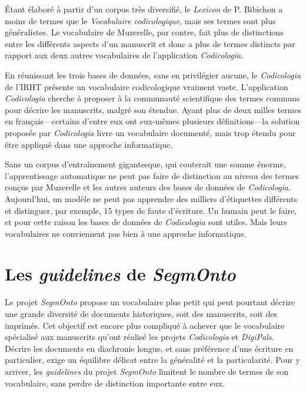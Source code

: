 \documentclass[class=article, crop=false]{standalone}
\begin{document}
\noindent Étant élaboré à partir d'un corpus très diversifié, le \textit{Lexicon} de P. Bibichon a moins de termes que le \textit{Vocabulaire codicologique}, mais ses termes sont plus généralistes. Le vocabulaire de Muzerelle, par contre, fait plus de distinctions entre les différents aspects d'un manuscrit et donc a plus de termes distincts par rapport aux deux autres vocabulaires de l'application \textit{Codicologia}.

En réunissant les trois bases de données, sans en privilégier aucune, le \textit{Codicologia} de l'IRHT présente un vocabulaire codicologique vraiment vaste. 
L'application \textit{Codicologia} cherche à proposer à la communauté scientifique des termes communs pour décrire les manuscrits, malgré son étendue.
Ayant plus de deux milles termes en français---certains d'entre eux ont eux-mêmes plusieurs définitions---la solution proposée par \textit{Codicologia} livre un vocabulaire documenté, mais trop étendu pour être appliqué dans une approche informatique.

Sans un corpus d'entraînement gigantesque, qui couterait une somme énorme, l'apprentissage automatique ne peut pas faire de distinction au niveau des termes conçus par Muzerelle et les autres auteurs des bases de données de \textit{Codicologia}. Aujourd'hui, un modèle ne peut pas apprendre des milliers d'étiquettes différents et distinguer, par exemple, 15 types de faute d'écriture. Un humain peut le faire, et pour cette raison les bases de données de \textit{Codicologia} sont utiles. Mais leurs vocabulaires ne conviennent pas bien à une approche informatique.  

\section{Les \textit{guidelines} de \textit{SegmOnto}}

Le projet \textit{SegmOnto} propose un vocabulaire plus petit qui peut pourtant décrire une grande diversité de documents historiques, soit des manuscrits, soit des imprimés. Cet objectif est encore plus compliqué à achever que le vocabulaire spécialisé aux manuscrits qu'ont réalisé les projets \textit{Codicologia} et \textit{DigiPals}.
Décrire les documents en diachronie longue, et sans préférence d'une écriture en particulier, exige un équilibre délicat entre la généralité et la particularité. Pour y arriver, les \textit{guidelines} du projet \textit{SegmOnto} limitent le nombre de termes de son vocabulaire, sans perdre de distinction importante entre eux.
\end{document}
